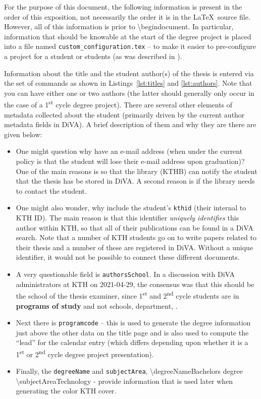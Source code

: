 For the purpose of this document, the following information is present in the order of this exposition, not necessarily the order it is in the \LaTeX~source file. However, all of this information is prior to \textbackslash begin{document}. In particular, information that should be knowable at the start of the degree project is placed into a file named \texttt{custom\_configuration.tex} – to make it easier to pre-configure a project for a student or students (as was described in ).

Information about the title and the student author(s) of the thesis is entered via the set of commands as shown in Listings~\ref{lst:titles} and \ref{lst:authors}. Note that you can have either one or two authors (the latter should generally only occur in the case of a 1\textsuperscript{st} cycle degree project). There are several other elements of metadata collected about the student (primarily driven by the current author metadata fields in DiVA). A brief description of them and why they are there are given below:
\begin{itemize}
    \item One might question why have an e-mail address (when under the current policy is that the student will lose their e-mail address upon graduation)? One of the main reasons is so that the library (\ie KTHB) can notify the student that the thesis has be stored in DiVA. A second reason is if the library needs to contact the student.
    
    \item One might also wonder, why include the student’s \texttt{kthid} (\ie their internal to KTH ID). The main reason is that this identifier \textit{uniquely identifies} this author within KTH, so that all of their publications can be found in a DiVA search. Note that a number of KTH students go on to write papers related to their thesis and a number of these are registered in DiVA. Without a unique identifier, it would not be possible to connect these different documents.
    
    \item A very questionable field is \texttt{authorsSchool}. In a discussion with DiVA administrators at KTH on 2021-04-29, the consensus was that this should be the school of the thesis examiner, since 1\textsuperscript{st} and 2\textsuperscript{nd} cycle students are in \textbf{programs of study} and not schools, department, \etc.
    
    \item Next there is \texttt{programcode} – this is used to generate the degree information just above the other data on the title page and is also used to compute the “lead” for the calendar entry (which differs depending upon whether it is a 1\textsuperscript{st} or 2\textsuperscript{nd} cycle degree project presentation).
    
    \item Finally, the \texttt{degreeName} and \texttt{subjectArea}, \eg \textbackslash degreeName{Bachelors degree} \textbackslash subjectArea{Technology }- provide information that is used later when generating the color KTH cover.
\end{itemize}
